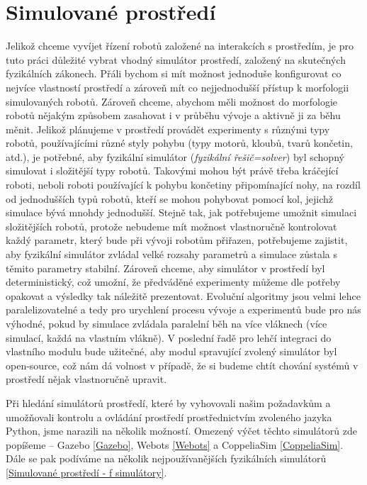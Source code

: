 \section{Simulované prostředí} \label{Simulované prostředí}

Jelikož chceme vyvíjet řízení robotů založené na interakcích s prostředím, je
pro tuto práci důležité vybrat vhodný simulátor prostředí, založený na
skutečných fyzikálních zákonech. Přáli bychom si mít možnost jednoduše
konfigurovat co nejvíce vlastností prostředí a zároveň mít co nejjednodušší
přístup k morfologii simulovaných robotů. Zároveň chceme, abychom měli možnost
do morfologie robotů nějakým způsobem zasahovat i v průběhu vývoje a aktivně ji
za běhu měnit. Jelikož plánujeme v prostředí provádět experimenty s různými
typy robotů, používajícími různé styly pohybu (typy motorů, kloubů, tvarů
končetin, atd.), je potřebné, aby fyzikální simulátor (\emph{fyzikální
řešič=solver}) byl schopný simulovat i složitější typy robotů. Takovými mohou
být právě třeba kráčející roboti, neboli roboti používající k pohybu končetiny
připomínající nohy, na rozdíl od jednodušších typů robotů, kteří se mohou
pohybovat pomocí kol, jejichž simulace bývá mnohdy jednodušší. Stejně tak, jak
potřebujeme umožnit simulaci složitějších robotů, protože nebudeme mít možnost
vlastnoručně kontrolovat každý parametr, který bude při vývoji robotům
přiřazen, potřebujeme zajistit, aby fyzikální simulátor zvládal velké rozsahy
parametrů a simulace zůstala s těmito parametry stabilní. Zároveň chceme, aby
simulátor v prostředí byl deterministický, což umožní, že předváděné
experimenty můžeme dle potřeby opakovat a výsledky tak náležitě prezentovat.
Evoluční algoritmy jsou velmi lehce paralelizovatelné a tedy pro urychlení
procesu vývoje a experimentů bude pro nás výhodné, pokud by simulace zvládala
paralelní běh na více vláknech (více simulací, každá na vlastním vlákně). V
poslední řadě pro lehčí integraci do vlastního modulu bude užitečné, aby modul
spravující zvolený simulátor byl open-source, což nám dá volnost v případě, že
si budeme chtít chování systémů v prostředí nějak vlastnoručně upravit.

Při hledání simulátorů prostředí, které by vyhovovali našim požadavkům a
umožňovali kontrolu a ovládání prostředí prostřednictvím zvoleného jazyka
Python, jsme narazili na několik možností. Omezený výčet těchto simulátorů zde
popíšeme -- Gazebo \ref{Gazebo}, Webots \ref{Webots} a CoppeliaSim
\ref{CoppeliaSim}. Dále se pak podíváme na několik nejpoužívanějších
fyzikálních simulátorů \ref{Simulované prostředí - f simulátory}.

